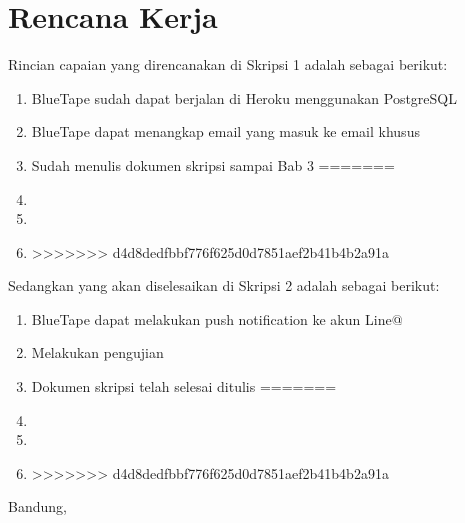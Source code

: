 \documentclass[a4paper,twoside]{article}
\begin{document}
\section{Rencana Kerja}
Rincian capaian yang direncanakan di Skripsi 1 adalah sebagai berikut:
\begin{enumerate}
<<<<<<< HEAD
\item BlueTape sudah dapat berjalan di Heroku menggunakan PostgreSQL
\item BlueTape dapat menangkap email yang masuk ke email khusus
\item Sudah menulis dokumen skripsi sampai Bab 3
=======
\item
\item
\item
>>>>>>> d4d8dedfbbf776f625d0d7851aef2b41b4b2a91a
\end{enumerate}

Sedangkan yang akan diselesaikan di Skripsi 2 adalah sebagai berikut:
\begin{enumerate}
<<<<<<< HEAD
\item BlueTape dapat melakukan push notification ke akun Line@
\item Melakukan pengujian
\item Dokumen skripsi telah selesai ditulis
=======
\item
\item
\item
>>>>>>> d4d8dedfbbf776f625d0d7851aef2b41b4b2a91a
\end{enumerate}

\vspace{1cm}
\centering Bandung, \tanggal\\
\vspace{2cm} \nama \\ 
\vspace{1cm}

\newpage
\end{document}
